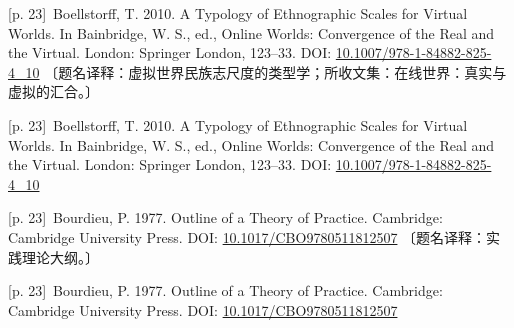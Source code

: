\documentclass[10pt,a4paper]{article}
\begin{document}
\noindent\begin{minipage}{\textwidth}\begin{minipage}[t]{\dimexpr.5\textwidth-4mm\relax}\noindent\begin{minipage}[t]{\linewidth}{\scriptsize\color{gray} [p. 23]}\ Boellstorff, T. 2010. A Typology of Ethnographic Scales for Virtual Worlds. In Bainbridge, W. S., ed., Online Worlds: Convergence of the Real and the Virtual. London: Springer London, 123–33. DOI: \url{10.1007/978-1-84882-825-4_10} 〔题名译释：虚拟世界民族志尺度的类型学；所收文集：在线世界：真实与虚拟的汇合。〕\par\end{minipage}\par\end{minipage}\hfill\begin{minipage}[t]{\dimexpr.5\textwidth-4mm\relax}\noindent\begin{minipage}[t]{\linewidth}{\scriptsize\color{gray} [p. 23]}\ Boellstorff, T. 2010. A Typology of Ethnographic Scales for Virtual Worlds. In Bainbridge, W. S., ed., Online Worlds: Convergence of the Real and the Virtual. London: Springer London, 123–33. DOI: \url{10.1007/978-1-84882-825-4_10}\par\end{minipage}\par\end{minipage}\end{minipage}\par
\noindent\begin{minipage}{\textwidth}\begin{minipage}[t]{\dimexpr.5\textwidth-4mm\relax}\noindent\begin{minipage}[t]{\linewidth}{\scriptsize\color{gray} [p. 23]}\ Bourdieu, P. 1977. Outline of a Theory of Practice. Cambridge: Cambridge University Press. DOI: \url{10.1017/CBO9780511812507} 〔题名译释：实践理论大纲。〕\par\end{minipage}\par\end{minipage}\hfill\begin{minipage}[t]{\dimexpr.5\textwidth-4mm\relax}\noindent\begin{minipage}[t]{\linewidth}{\scriptsize\color{gray} [p. 23]}\ Bourdieu, P. 1977. Outline of a Theory of Practice. Cambridge: Cambridge University Press. DOI: \url{10.1017/CBO9780511812507}\par\end{minipage}\par\end{minipage}\end{minipage}\par
\end{document}
